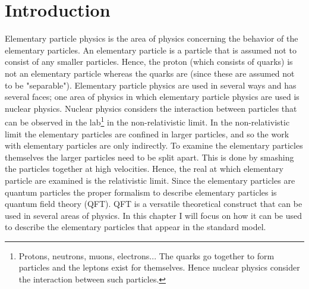 \chapter*{Introduction}
Elementary particle physics is the area of physics concerning the behavior of the elementary particles. An elementary particle is a particle that is assumed not to consist of any smaller particles. Hence, the proton (which consists of quarks) is not an elementary particle whereas the quarks are (since these are assumed not to be "separable"). Elementary particle physics are used in several ways and has several faces; one area of physics in which elementary particle physics are used is nuclear physics. Nuclear physics considers the interaction between particles that can be observed in the lab\footnote{Protons, neutrons, muons, electrons... The quarks go together to form particles and the leptons exist for themselves. Hence nuclear physics consider the interaction between such particles.} in the non-relativistic limit. In the non-relativistic limit the elementary particles are confined in larger particles, and so the work with elementary particles are only indirectly. To examine the elementary particles themselves the larger particles need to be split apart. This is done by smashing the particles together at high velocities. Hence, the real at which elementary particle are examined is the relativistic limit. Since the elementary particles are quantum particles the proper formalism to describe elementary particles is quantum field theory (QFT).
QFT is a versatile theoretical construct that can be used in several areas of physics. In this chapter I will focus on how it can be used to describe the elementary particles that appear in the standard model. 

